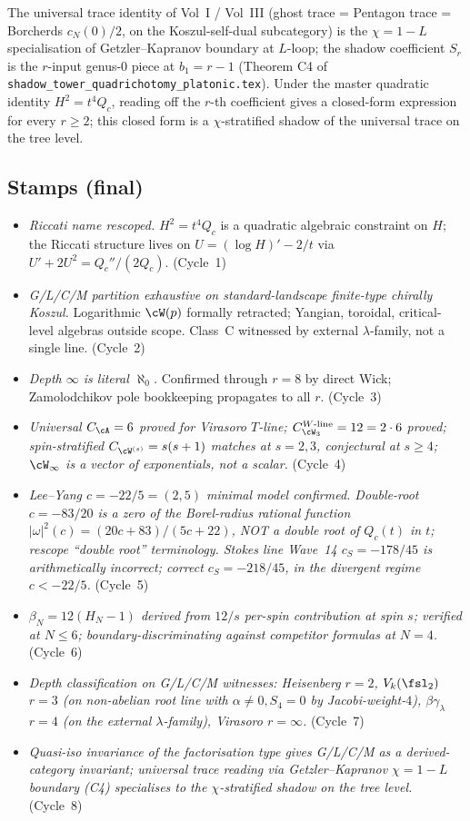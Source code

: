 The universal trace identity of Vol~I / Vol~III
(ghost trace = Pentagon trace = Borcherds $c_N(0)/2$, on the
Koszul-self-dual subcategory) is the $\chi = 1 - L$ specialisation of
Getzler--Kapranov boundary at $L$-loop; the shadow coefficient $S_r$ is the
$r$-input genus-$0$ piece at $b_1 = r - 1$ (Theorem C4 of
\texttt{shadow\_tower\_quadrichotomy\_platonic.tex}). Under the master
quadratic identity $H^2 = t^4 Q_c$, reading off the $r$-th coefficient
gives a closed-form expression for every $r \ge 2$; this closed form is a
$\chi$-stratified shadow of the universal trace on the tree level.

\subsection*{Stamps (final)}

\begin{itemize}
\item \emph{Riccati name rescoped.} $H^2 = t^4 Q_c$ is a quadratic
algebraic constraint on $H$; the Riccati structure lives on $U = (\log H)'
- 2/t$ via $U' + 2U^2 = Q_c''/(2Q_c)$. (Cycle~1)
\item \emph{G/L/C/M partition exhaustive on standard-landscape finite-type
chirally Koszul.} Logarithmic $\cW(p)$ formally retracted; Yangian,
toroidal, critical-level algebras outside scope. Class~C witnessed by
external $\lambda$-family, not a single line. (Cycle~2)
\item \emph{Depth $\infty$ is literal $\aleph_0$.} Confirmed through
$r = 8$ by direct Wick; Zamolodchikov pole bookkeeping propagates to all
$r$. (Cycle~3)
\item \emph{Universal $C_\cA = 6$ proved for Virasoro $T$-line;
$C^{W\text{-line}}_{\cW_3} = 12 = 2 \cdot 6$ proved; spin-stratified
$C_{\cW^{(s)}} = s(s+1)$ matches at $s = 2, 3$, conjectural at $s \ge 4$;
$\cW_\infty$ is a vector of exponentials, not a scalar.} (Cycle~4)
\item \emph{Lee--Yang $c = -22/5 = (2,5)$ minimal model confirmed.
Double-root $c = -83/20$ is a zero of the Borel-radius rational function
$|\omega|^2(c) = (20c+83)/(5c+22)$, NOT a double root of $Q_c(t)$ in
$t$; rescope ``double root'' terminology.
Stokes line Wave~14 $c_S = -178/45$ is arithmetically incorrect; correct
$c_S = -218/45$, in the divergent regime $c < -22/5$.} (Cycle~5)
\item \emph{$\beta_N = 12(H_N - 1)$ derived from $12/s$ per-spin
contribution at spin $s$; verified at $N \le 6$; boundary-discriminating
against competitor formulas at $N = 4$.} (Cycle~6)
\item \emph{Depth classification on G/L/C/M witnesses: Heisenberg $r = 2$,
$V_k(\fsl_2)$ $r = 3$ (on non-abelian root line with $\alpha \ne 0, S_4 = 0$
by Jacobi-weight-$4$), $\beta\gamma_\lambda$ $r = 4$ (on the external
$\lambda$-family), Virasoro $r = \infty$.} (Cycle~7)
\item \emph{Quasi-iso invariance of the factorisation type gives G/L/C/M
as a derived-category invariant; universal trace reading via
Getzler--Kapranov $\chi = 1 - L$ boundary (C4) specialises to the
$\chi$-stratified shadow on the tree level.} (Cycle~8)
\end{itemize}

